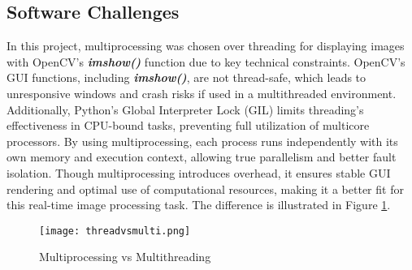 \newpage
\subsection{Software Challenges}
In this project, multiprocessing was chosen over threading for displaying images with OpenCV's \textbf{\textit{imshow()}} function due to key technical constraints. OpenCV's GUI functions, including \textbf{\textit{imshow()}}, are not thread-safe, which leads to unresponsive windows and crash risks if used in a multithreaded environment. Additionally, Python's Global Interpreter Lock (GIL) limits threading's effectiveness in CPU-bound tasks, preventing full utilization of multicore processors. By using multiprocessing, each process runs independently with its own memory and execution context, allowing true parallelism and better fault isolation. Though multiprocessing introduces overhead, it ensures stable GUI rendering and optimal use of computational resources, making it a better fit for this real-time image processing task. The difference is illustrated in Figure \ref{fig:thread-vs-multiprocessing}.

\begin{figure} [!htb]
    \centering
    \captionsetup{justification=centering}
    \texttt{[image: threadvsmulti.png]}
    \caption{Multiprocessing vs Multithreading}
    \label{fig:thread-vs-multiprocessing}
\end{figure}

